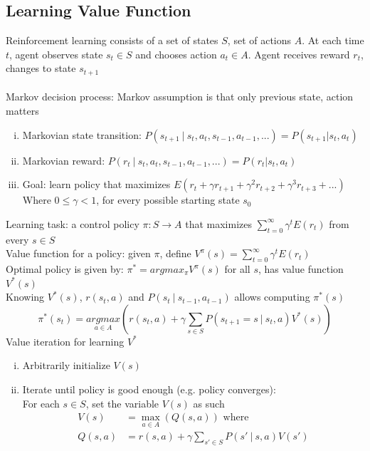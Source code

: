 \documentclass{article}
\begin{document}
		\subsection{Learning Value Function}
			Reinforcement learning consists of a set of states $S$, set of actions $A$. At each time $t$, agent observes state $s_t \in S$ and chooses action $a_t \in A$. Agent receives reward $r_t$, changes to state $s_{t + 1}$ \\
			\\
			Markov decision process: Markov assumption is that only previous state, action matters
			\begin{enumerate}[(i)]
				\item Markovian state transition: $P(s_{t + 1}\:|\:s_t, a_t, s_{t - 1}, a_{t - 1}, ...) = P(s_{t + 1} | s_t, a_t)$
				\item Markovian reward: $P(r_t\:|\:s_t, a_t, s_{t - 1}, a_{t - 1}, ...) = P(r_t | s_t, a_t)$
				\item Goal: learn policy that maximizes $E(r_t + \gamma r_{t + 1} + \gamma^2r_{t + 2} + \gamma^3r_{t + 3} + ...)$ \\
				Where $0 \leq \gamma < 1$, for every possible starting state $s_0$
				\end{enumerate}
			Learning task: a control policy $\pi: S \to A$ that maximizes $\sum_{t = 0}^\infty \gamma^tE(r_t)$ from every $s \in S$ \\
			Value function for a policy: given $\pi$, define $V^\pi(s) = \sum_{t = 0}^\infty \gamma^tE(r_t)$ \\
			Optimal policy is given by: $\pi^* = argmax_\pi V^\pi(s)$ for all $s$, has value function $V^*(s)$ \\
			Knowing $V^*(s)$, $r(s_t, a)$ and $P(s_t\:|\:s_{t - 1}, a_{t - 1})$ allows computing $\pi^*(s)$
			\begin{equation*}
				\pi^*(s_t) = \underset{a \in A}{argmax}\left(r(s_t, a) + \gamma\sum\limits_{s \in S} P(s_{t + 1} = s\:|\:s_t, a)V^*(s)\right)
				\end{equation*}
			Value iteration for learning $V^*$
			\begin{enumerate}[(i)]
				\item Arbitrarily initialize $V(s)$
				\item Iterate until policy is good enough (e.g. policy converges): \\
				For each $s \in S$, set the variable $V(s)$ as such
				\begin{align*}
					V(s) &= \max\limits_{a \in A}(Q(s, a))\text{ where} \\
					Q(s, a) &= r(s, a) + \gamma\sum\limits_{s' \in S}P(s'\:|\:s, a)V(s')
					\end{align*}
				\end{enumerate}
\end{document}

